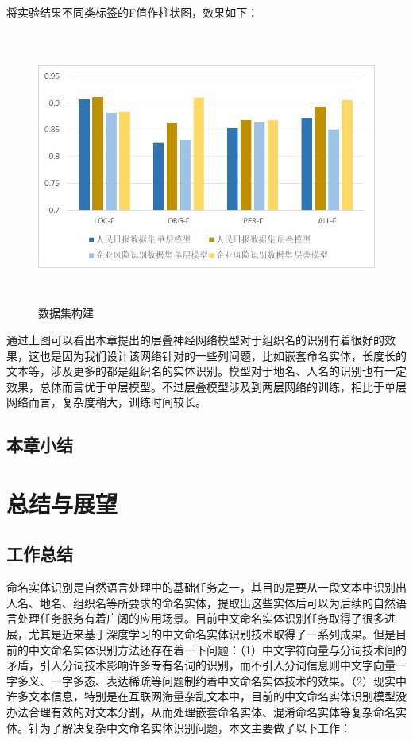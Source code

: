 \documentclass[winfonts,master,oneside,nobackinfo]{njuthesis}
\begin{document}
将实验结果不同类标签的F值作柱状图，效果如下：

\begin{figure}[H]
\centering
\begin{minipage}[t]{\textwidth}
\includegraphics[width=1\textwidth,height=9cm]{./figure/层叠模型f值比较.jpg}
\caption{数据集构建}
\label{lab:1}
\end{minipage}
\end{figure}

通过上图可以看出本章提出的层叠神经网络模型对于组织名的识别有着很好的效果，这也是因为我们设计该网络针对的一些列问题，比如嵌套命名实体，长度长的文本等，涉及更多的都是组织名的实体识别。模型对于地名、人名的识别也有一定效果，总体而言优于单层模型。不过层叠模型涉及到两层网络的训练，相比于单层网络而言，复杂度稍大，训练时间较长。

\section{本章小结}


\chapter{总结与展望}

\section{工作总结}

命名实体识别是自然语言处理中的基础任务之一，其目的是要从一段文本中识别出人名、地名、组织名等所要求的命名实体，提取出这些实体后可以为后续的自然语言处理任务服务有着广阔的应用场景。目前中文命名实体识别任务取得了很多进展，尤其是近来基于深度学习的中文命名实体识别技术取得了一系列成果。但是目前的中文命名实体识别方法还存在着一下问题：（1）中文字符向量与分词技术间的矛盾，引入分词技术影响许多专有名词的识别，而不引入分词信息则中文字向量一字多义、一字多态、表达稀疏等问题制约着中文命名实体技术的效果。（2）现实中许多文本信息，特别是在互联网海量杂乱文本中，目前的中文命名实体识别模型没办法合理有效的对文本分割，从而处理嵌套命名实体、混淆命名实体等复杂命名实体。针为了解决复杂中文命名实体识别问题，本文主要做了以下工作：
\end{document}
